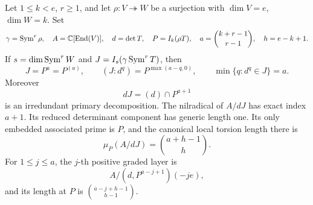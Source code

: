 \begin{theorem}
\label{thm:quotient-induced-primary-law}
Let \(1\le k<e\), \(r\ge1\), and let \(\rho:V\twoheadrightarrow W\)
be a surjection with \(\dim V=e\), \(\dim W=k\).  Set
\[
 \gamma=\operatorname{Sym}^r\rho,\quad
 A=\mathbb C[\operatorname{End}(V)],\quad d=\det T,\quad P=I_k(\rho T),
 \quad a=\binom{k+r-1}{r-1},\quad h=e-k+1.
\]
If \(s=\dim\operatorname{Sym}^rW\) and
\(J=I_s(\gamma\operatorname{Sym}^rT)\), then
\[
 J=P^a=P^{(a)},\qquad
 (J:d^q)=P^{\max(a-q,0)},\qquad
 \min\{q:d^q\in J\}=a.
\]
Moreover
\begin{equation}\label{eq:quotient-induced-decomposition}
 dJ=(d)\cap P^{a+1}
\end{equation}
is an irredundant primary decomposition.  The nilradical of
\(A/dJ\) has exact index \(a+1\).  Its reduced determinant component
has generic length one.  Its only embedded associated prime is \(P\),
and the canonical local torsion length there is
\[
 \mu_P(A/dJ)=\binom{a+h-1}{h}.
\]
For \(1\le j\le a\), the \(j\)-th positive graded layer is
\[
 A/(d,P^{a-j+1})(-je),
\]
and its length at \(P\) is
\(\binom{a-j+h-1}{h-1}\).
\end{theorem}
